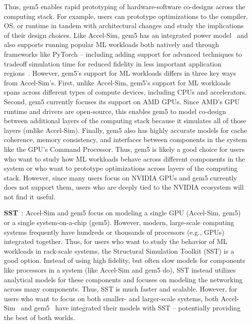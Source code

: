 Thus, gem5 enables rapid prototyping of hardware-software co-designs across the computing stack.
For example, users can prototype optimizations to the compiler, OS, or runtime in tandem with architectural changes and study the implications of their design choices.
Like Accel-Sim, gem5 has an integrated power model~\cite{SmithBruce2024-gem5Power} and also supports running popular ML workloads both natively and through frameworks like PyTorch -- including adding support for advanced techniques to tradeoff simulation time for reduced fidelity in less important application regions~\cite{RamadasPoremba2023-gem5GPUFS, RamadasPoremba2024-gem5MLSim, RamadasSinclair2024-gem5MLSim}.
However, gem5's support for ML workloads differs in three key ways from Accel-Sim's.
First, unlike Accel-Sim, gem5's support for ML workloads spans across different types of compute devices, including CPUs and accelerators.
Second, gem5 currently focuses its support on AMD GPUs.
Since AMD's GPU runtime and drivers are open-source, this enables gem5 to model co-design between additional layers of the computing stack because it simulates all of those layers (unlike Accel-Sim).
Finally, gem5 also has highly accurate models for cache coherence, memory consistency, and interfaces between components in the system like the GPU's Command Processor.
Thus, gem5 is likely a good choice for users who want to study how ML workloads behave across different components in the system or who want to prototype optimizations across layers of the computing stack.
However, since many users focus on NVIDIA GPUs and gem5 currently does not support them, users who are deeply tied to the NVIDIA ecosystem will not find it useful.

\noindent
\textbf{SST}~\cite{RodriguesHemmert2011-sst,SST}: Accel-Sim and gem5 focus on modeling a single GPU (Accel-Sim, gem5) or a single system-on-a-chip (gem5).
However, modern, large-scale computing systems frequently have hundreds or thousands of processors (e.g., GPUs) integrated together.
Thus, for users who want to study the behavior of ML workloads in rack-scale systems, the Structural Simulation Toolkit (SST) is a good option.
Instead of using high fidelity, but often slow models for components like processors in a system (like Accel-Sim and gem5 do), SST instead utilizes analytical models for these components and focuses on modeling the networking across many components.
Thus, SST is much faster and scalable.
However, for users who want to focus on both smaller- and larger-scale systems, both Accel-Sim~\cite{sandia_2, sandia_3} and gem5~\cite{hsieh2012gem5sst, nguyen2022gem5sst} have integrated their models with SST -- potentially providing the best of both worlds.

